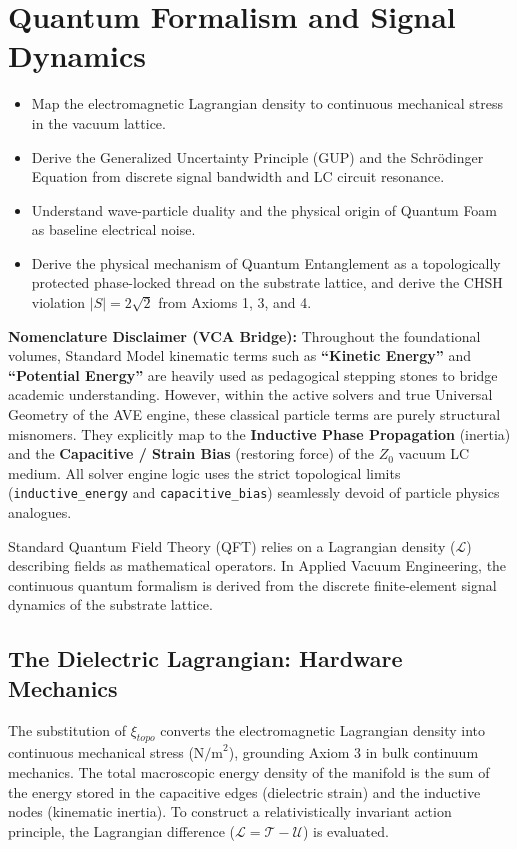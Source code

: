 \chapter{Quantum Formalism and Signal Dynamics}
\label{ch:quantum_signal_dynamics}

\begin{objectivebox}
\begin{itemize}
    \item Map the electromagnetic Lagrangian density to continuous mechanical stress in the vacuum lattice.
    \item Derive the Generalized Uncertainty Principle (GUP) and the Schr\"odinger Equation from discrete signal bandwidth and LC circuit resonance.
    \item Understand wave-particle duality and the physical origin of Quantum Foam as baseline electrical noise.
    \item Derive the physical mechanism of Quantum Entanglement as a topologically protected phase-locked thread on the substrate lattice, and derive the CHSH violation $|S| = 2\sqrt{2}$ from Axioms 1, 3, and 4.
\end{itemize}
\end{objectivebox}

\begin{warningbox}
\textbf{Nomenclature Disclaimer (VCA Bridge):} Throughout the foundational volumes, Standard Model kinematic terms such as \textbf{``Kinetic Energy''} and \textbf{``Potential Energy''} are heavily used as pedagogical stepping stones to bridge academic understanding. However, within the active solvers and true Universal Geometry of the AVE engine, these classical particle terms are purely structural misnomers. 
They explicitly map to the \textbf{Inductive Phase Propagation} (inertia) and the \textbf{Capacitive / Strain Bias} (restoring force) of the $Z_0$ vacuum LC medium. All solver engine logic uses the strict topological limits (\texttt{inductive\_energy} and \texttt{capacitive\_bias}) seamlessly devoid of particle physics analogues.
\end{warningbox}

Standard Quantum Field Theory (QFT) relies on a Lagrangian density ($\mathcal{L}$) describing fields as mathematical operators. In Applied Vacuum Engineering, the continuous quantum formalism is derived from the discrete finite-element signal dynamics of the substrate lattice.

\section{The Dielectric Lagrangian: Hardware Mechanics}
The substitution of $\xi_{topo}$ converts the electromagnetic Lagrangian density into continuous mechanical stress ($\text{N/m}^2$), grounding Axiom 3 in bulk continuum mechanics. The total macroscopic energy density of the manifold is the sum of the energy stored in the capacitive edges (dielectric strain) and the inductive nodes (kinematic inertia). To construct a relativistically invariant action principle, the Lagrangian difference ($\mathcal{L} = \mathcal{T} - \mathcal{U}$) is evaluated.


